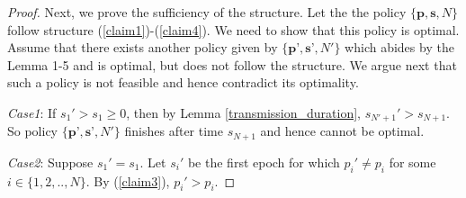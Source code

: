 \begin{proof}

Next, we prove the sufficiency of the structure. Let the the policy $\{\textbf{p},\textbf{s},N\}$ follow  structure (\ref{claim1})-(\ref{claim4}). We need to show that this policy is optimal. Assume that there exists another policy given by $\{\textbf{p'},\textbf{s'},N'\}$ which abides by the Lemma 1-5 and is optimal, but does not follow the structure. We argue next that such a policy is not feasible and hence contradict its optimality. 

\textit{Case1}: If $s_1'>s_1\ge 0$, then by Lemma \ref{transmission_duration}, $s_{N'+1}'>s_{N+1}$. So policy $\{\textbf{p'},\textbf{s'},N'\}$ finishes after time $s_{N+1}$ and hence cannot be optimal. 

\textit{Case2}: Suppose $s_1'=s_1$. Let $s_i'$ be the first epoch for which $p_i'\ne p_i$ for some $i \in \{1,2,..,N\}$. By (\ref{claim3}), $p_i'>p_i$. 



\end{proof}
